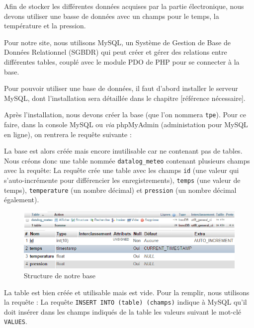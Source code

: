 Afin de stocker les différentes données acquises par la partie électronique, nous devons utiliser une basse de données avec un champs pour le temps, la température et la pression.

\Espace

Pour notre site, nous utilisons MySQL, un Système de Gestion de Base de Données Relationnel (SGBDR) qui peut créer et gérer des relations entre différentes tables, couplé avec le module PDO de PHP pour se connecter à la base.

Pour pouvoir utiliser une base de données, il faut d'abord installer le serveur MySQL, dont l'installation sera détaillée dans le chapitre [référence nécessaire].

Après l'installation, nous devons créer la base (que l'on nommera \verb-tpe-). Pour ce faire, dans la console MySQL ou \emph{via} phpMyAdmin (administation pour MySQL en ligne), on rentrera le requête suivante :

La base est alors créée mais encore inutilisable car ne contenant pas de tables. Nous créons donc une table nommée \verb-datalog_meteo- contenant plusieurs champs avec la requête:
La requête crée une table avec les champs \verb-id- (une valeur qui s'auto-incrémente pour différencier les enregistrements), \verb-temps- (une valeur de temps), \verb-temperature- (un nombre décimal) et \verb-pression- (un nombre décimal également). 

\begin{figure}[!h]
	\centering
	\includegraphics[width=.8\linewidth]{Images/BDD}
	
	\vspace{5mm}
	
	\includegraphics[width=.8\linewidth]{Images/Structure_BDD}
	\caption{Structure de notre base}
\end{figure}

La table est bien créée et utilisable mais est vide. Pour la remplir, nous utilisons la requête :
La requête \verb-INSERT INTO (table) (champs)- indique à MySQL qu'il doit insérer dans les champs indiqués de la table les valeurs suivant le mot-clé \verb-VALUES-.

